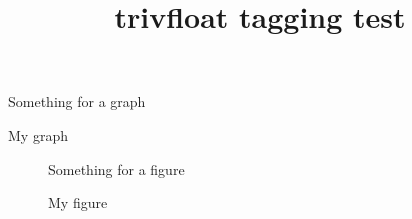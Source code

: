 \documentclass{article}
\title{trivfloat tagging test}
\begin{document}
\listofgraphs

\listoffigures

\begin{graph}
\centering
Something for a graph
\caption{My graph}
\end{graph}

\begin{figure}
\centering
Something for a figure
\caption{My figure}
\end{figure}
\end{document}
